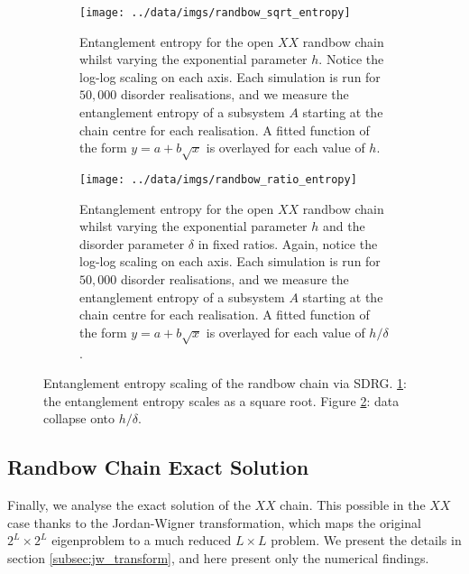 \begin{figure}
     \centering
     \begin{subfigure}[b]{0.8\textwidth}
   \centering
    \texttt{[image: ../data/imgs/randbow\_sqrt\_entropy]}
    \caption{Entanglement entropy for the open $XX$ randbow chain whilst varying the exponential parameter $h$. Notice the log-log scaling on each axis. Each simulation is run for $50, 000$ disorder realisations, and we measure the entanglement entropy of a subsystem $A$ starting at the chain centre for each realisation. A fitted function of the form $y = a + b\sqrt{x}$ is overlayed for each value of $h$.}
    \label{fig:randbow_sqrt_entropy}
	\end{subfigure}%
   \hfill
     \begin{subfigure}[b]{0.8\textwidth}
     \centering
    \texttt{[image: ../data/imgs/randbow\_ratio\_entropy]}
    \caption{Entanglement entropy for the open $XX$ randbow chain whilst varying the exponential parameter $h$ and the disorder parameter $\delta$ in fixed ratios. Again, notice the log-log scaling on each axis. Each simulation is run for $50, 000$ disorder realisations, and we measure the entanglement entropy of a subsystem $A$ starting at the chain centre for each realisation. A fitted function of the form $y = a + b\sqrt{x}$ is overlayed for each value of $h / \delta$.}
    \label{fig:randbow_ratio_entropy}
        \end{subfigure}
           \caption{Entanglement entropy scaling of the randbow chain via SDRG. \ref{fig:randbow_sqrt_entropy}: the entanglement entropy scales as a square root. Figure \ref{fig:randbow_ratio_entropy}: data collapse onto $h / \delta$.}
       \label{fig:randbow_entropy_joint}
\end{figure}





\subsection{Randbow Chain Exact Solution}\label{sec:randbow_old_results_exact} 
Finally, we analyse the exact solution of the $XX$ chain. This possible in the $XX$ case thanks to the Jordan-Wigner transformation, which maps the original $2^L \times 2^L$ eigenproblem to a much reduced $L \times L$ problem. We present the details in section \ref{subsec:jw_transform}, and here present only the numerical findings.


